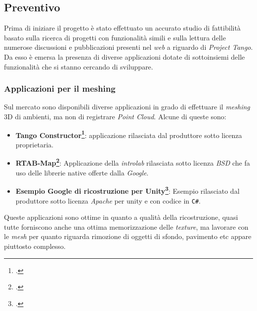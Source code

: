 \subsection{Preventivo}
Prima di iniziare il progetto è stato effettuato un accurato studio di fattibilità basato sulla ricerca di progetti con funzionalità simili e sulla lettura delle numerose discussioni e pubblicazioni presenti nel \emph{web} a riguardo di \emph{Project Tango}.\\
Da esso è emersa la presenza di diverse applicazioni dotate di sottoinsiemi delle funzionalità che si stanno cercando di sviluppare.

\subsubsection{Applicazioni per il meshing}
Sul mercato sono disponibili diverse applicazioni in grado di effettuare il \emph{meshing} 3D di ambienti, ma non di registrare \emph{Point Cloud}. Alcune di queste sono:
\begin{itemize}
	\item \textbf{Tango Constructor\footcite{site: https://developers.google.com/tango/tools/constructor}}: applicazione rilasciata dal produttore sotto licenza proprietaria.
	\item \textbf{RTAB-Map\footcite{site: http://introlab.github.io/rtabmap/}}: Applicazione della \emph{introlab} rilasciata sotto licenza \emph{BSD} che fa uso delle librerie native offerte dalla \emph{Google}.
	\item \textbf{Esempio Google di ricostruzione per Unity\footcite{site: https://github.com/googlesamples/tango-examples-unity}}: Esempio rilasciato dal produttore sotto licenza \emph{Apache} per unity e con codice in \texttt{C\#}.
\end{itemize}
Queste applicazioni sono ottime in quanto a qualità della ricostruzione, quasi tutte forniscono anche una ottima memorizzazione delle \emph{texture}, ma lavorare con le \emph{mesh} per quanto riguarda rimozione di oggetti di sfondo, pavimento etc appare piuttosto complesso.

